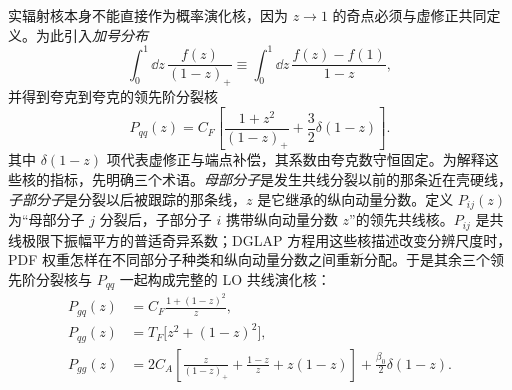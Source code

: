 实辐射核本身不能直接作为概率演化核，因为 $z\to1$ 的奇点必须与虚修正共同定义。为此引入\emph{加号分布}
\begin{equation}
 \int_0^1\dd z\,
 \frac{f(z)}{(1-z)_+}
 \equiv
 \int_0^1\dd z\,
 \frac{f(z)-f(1)}{1-z},
 \label{eq:plus-distribution-definition-dp10}
\end{equation}
并得到夸克到夸克的领先阶分裂核
\begin{equation}
 \boxed{
 P_{qq}(z)
 =C_F\left[
 \frac{1+z^2}{(1-z)_+}
 +\frac32\delta(1-z)
 \right].}
 \label{eq:Pqq-leading-dp10}
\end{equation}
其中 $\delta(1-z)$ 项代表虚修正与端点补偿，其系数由夸克数守恒固定。为解释这些核的指标，先明确三个术语。\emph{母部分子}是发生共线分裂以前的那条近在壳硬线，\emph{子部分子}是分裂以后被跟踪的那条线，$z$ 是它继承的纵向动量分数。定义 $P_{ij}(z)$ 为“母部分子 $j$ 分裂后，子部分子 $i$ 携带纵向动量分数 $z$”的领先共线核。$P_{ij}$ 是共线极限下振幅平方的普适奇异系数；DGLAP 方程用这些核描述改变分辨尺度时，PDF 权重怎样在不同部分子种类和纵向动量分数之间重新分配。于是其余三个领先阶分裂核与 $P_{qq}$ 一起构成完整的 LO 共线演化核：
\begin{equation}
\boxed{
\begin{aligned}
 P_{gq}(z)
 &=C_F\frac{1+(1-z)^2}{z},\\
 P_{qg}(z)
 &=T_F\bigl[z^2+(1-z)^2\bigr],\\
 P_{gg}(z)
 &=2C_A\left[
 \frac{z}{(1-z)_+}+\frac{1-z}{z}+z(1-z)
 \right]
 +\frac{\beta_0}{2}\delta(1-z).
\end{aligned}}
\label{eq:qcd-lo-splitting-kernels-rest-dp83}
\end{equation}

